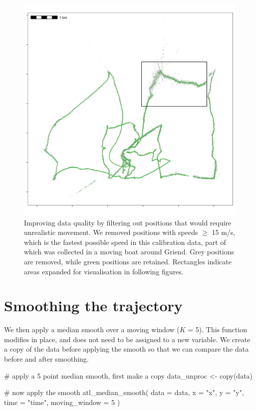\documentclass[]{scrreprt}
\newenvironment{Shaded}{}{}
\newcommand{\CommentTok}[1]{\textcolor[rgb]{0.00,0.50,0.00}{#1}}
\newcommand{\DataTypeTok}[1]{#1}
\newcommand{\DecValTok}[1]{#1}
\newcommand{\KeywordTok}[1]{\textcolor[rgb]{0.00,0.00,1.00}{#1}}
\newcommand{\NormalTok}[1]{#1}
\newcommand{\StringTok}[1]{\textcolor[rgb]{0.00,0.50,0.50}{#1}}
\begin{document}
\begin{figure}
\centering
\includegraphics{figures/fig_speed_outlier.png}
\caption{Improving data quality by filtering out positions that would require unrealistic movement. We removed positions with speeds \(\geq\) 15 m/s, which is the fastest possible speed in this calibration data, part of which was collected in a moving boat around Griend. Grey positions are removed, while green positions are retained. Rectangles indicate areas expanded for visualisation in following figures.}
\end{figure}

\hypertarget{smoothing-the-trajectory}{%
\section{Smoothing the trajectory}\label{smoothing-the-trajectory}}

We then apply a median smooth over a moving window (\(K\) = 5).
This function modifies in place, and does not need to be assigned to a new variable.
We create a copy of the data before applying the smooth so that we can compare the data before and after smoothing.

\begin{Shaded}
\begin{Highlighting}[]
\CommentTok{# apply a 5 point median smooth, first make a copy}
\NormalTok{data_unproc <-}\StringTok{ }\KeywordTok{copy}\NormalTok{(data)}

\CommentTok{# now apply the smooth}
\KeywordTok{atl_median_smooth}\NormalTok{(}
  \DataTypeTok{data =}\NormalTok{ data,}
  \DataTypeTok{x =} \StringTok{"x"}\NormalTok{, }\DataTypeTok{y =} \StringTok{"y"}\NormalTok{, }\DataTypeTok{time =} \StringTok{"time"}\NormalTok{,}
  \DataTypeTok{moving_window =} \DecValTok{5}
\NormalTok{)}
\end{Highlighting}
\end{Shaded}
\end{document}

